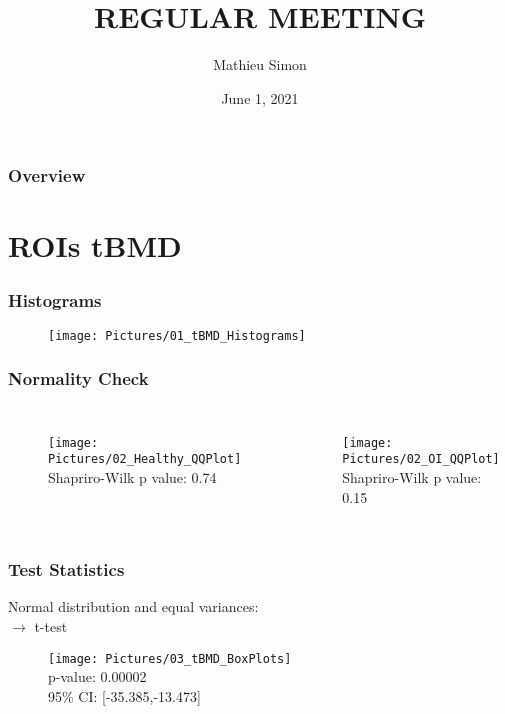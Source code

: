 \documentclass[xcolor=table]{beamer}
\title[Regular Meeting]{
\uppercase{Regular Meeting}
}
\author{Mathieu Simon}
\institute[University of Bern]
{
MSc - Biomedical Engineering \\
University of Bern, Faculty of Medicine \\
\medskip
}
\date{June 1, 2021}
\begin{document}
\begin{frame}
\titlepage
\end{frame}


\begin{frame}
	\frametitle{Overview}
	\tableofcontents
\end{frame}


\section{ROIs tBMD}

\begin{frame}
	\frametitle{Histograms}
	\begin{figure}
		\texttt{[image: Pictures/01\_tBMD\_Histograms]}
	\end{figure}
\end{frame}

\begin{frame}
	\frametitle{Normality Check}
	\begin{columns}
		\centering
		\begin{figure}
			\texttt{[image: Pictures/02\_Healthy\_QQPlot]}\\
			Shapriro-Wilk p value: 0.74
		\end{figure}
		\centering
		\begin{figure}
			\texttt{[image: Pictures/02\_OI\_QQPlot]}\\
			Shapriro-Wilk p value: 0.15
		\end{figure}
	\end{columns}
\end{frame}

\begin{frame}
	\frametitle{Test Statistics}
	Normal distribution and equal variances:\\
	$\rightarrow$ t-test
	\begin{figure}
		\texttt{[image: Pictures/03\_tBMD\_BoxPlots]}\\
		p-value: 0.00002\\
		95\% CI: [-35.385,-13.473]
	\end{figure}
\end{frame}
\end{document}
